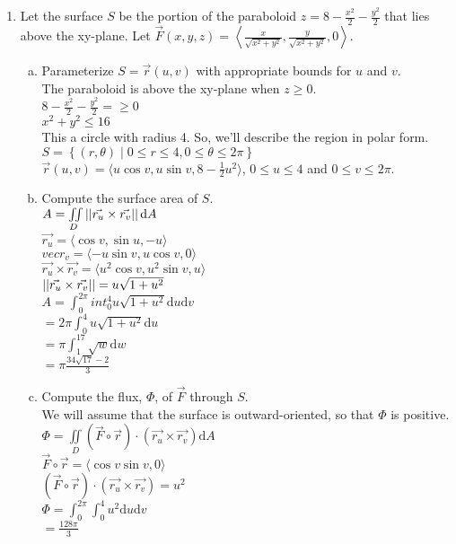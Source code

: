 \begin{enumerate}
	\item Let the surface $S$ be the portion of the paraboloid $z = 8 - \frac{x^2}{2} - \frac{y^2}{2}$ that lies above the xy-plane. Let $\vec{F}(x,y,z) = \left< \frac{x}{\sqrt{x^2 + y^2}}, \frac{y}{\sqrt{x^2 + y^2}}, 0 \right>$.
	\begin{enumerate}[a.]
		\item Parameterize $S = \vec{r}(u,v)$ with appropriate bounds for $u$ and $v$.\\
		\indent
		The paraboloid is above the xy-plane when $z \geq 0$.\\
		$8 - \frac{x^2}{2} - \frac{y^2}{2} = \geq 0$\\
		$x^2 + y^2 \leq 16$\\
		This a circle with radius 4. So, we'll describe the region in polar form.\\
		$S = \left\{ (r,\theta) \mid 0 \leq r \leq 4, 0 \leq \theta \leq 2\pi \right\}$\\
		$\vec{r}(u,v) = \langle u\cos{v}, u\sin{v}, 8 - \frac{1}{2}u^2 \rangle$, $0 \leq u \leq 4$ and $0 \leq v \leq 2\pi$.\\
		
		\item Compute the surface area of $S$.\\
		\indent
		$A = \iint\limits_{D}{\left|\left|\vec{r_u} \times \vec{r_v}\right|\right|\mathrm{d}A}$\\
		$\vec{r_u} = \langle \cos{v}, \sin{u}, -u \rangle$\\
		$vec{r_v} = \langle -u\sin{v}, u\cos{v}, 0 \rangle$\\
		$\vec{r_u} \times \vec{r_v} = \langle u^2\cos{v}, u^2\sin{v}, u\rangle$\\
		$\left|\left|\vec{r_u} \times \vec{r_v}\right|\right| = u\sqrt{1 + u^2}$\\
		$A = \int_{0}^{2\pi}{int_{0}^{4}{u\sqrt{1 + u^2}\mathrm{d}u}\mathrm{d}v}$\\
		$= 2\pi\int_{0}^{4}{u\sqrt{1 + u^2}\mathrm{d}u}$\\
		$= \pi\int_{1}^{17}{\sqrt{w}\mathrm{d}w}$\\
		$= \pi\frac{34\sqrt{17} - 2}{3}$\\
		
		\item Compute the flux, $\Phi$, of $\vec{F}$ through $S$.\\
		\indent
		We will assume that the surface is outward-oriented, so that $\Phi$ is positive.\\
		$\Phi = \iint\limits_{D}{\left(\vec{F}\circ\vec{r}\right) \cdot \left(\vec{r_u} \times \vec{r_v}\right)\mathrm{d}A}$\\
		$\vec{F}\circ\vec{r} = \langle \cos{v}\sin{v}, 0 \rangle$\\
		$\left(\vec{F}\circ\vec{r}\right) \cdot \left(\vec{r_u} \times \vec{r_v}\right) = u^2$\\
		$\Phi = \int_{0}^{2\pi}{\int_{0}^{4}{u^2\mathrm{d}u}\mathrm{d}v}$\\
		$= \frac{128\pi}{3}$\\
	\end{enumerate}
	

\end{enumerate}
